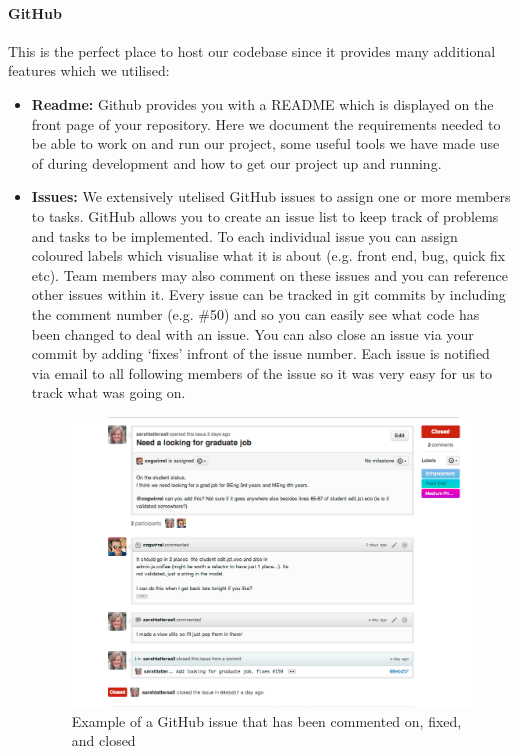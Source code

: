     \paragraph{GitHub\cite{github}} This is the perfect place to host our codebase since it provides many additional features which we utilised:
    \begin{itemize}
        \item \textbf{Readme:} Github provides you with a README which is displayed on the front page of your repository. Here we document the requirements needed to be able to work on and run our project, some useful tools we have made use of during development and how to get our project up and running.
        \item \textbf{Issues:} We extensively utelised GitHub issues to assign one or more members to tasks. GitHub allows you to create an issue list to keep track of problems and tasks to be implemented. To each individual issue you can assign coloured labels which visualise what it is about (e.g. front end, bug, quick fix etc). Team members may also comment on these issues and you can reference other issues within it. Every issue can be tracked in git commits by including the comment number (e.g. \#50) and so you can easily see what code has been changed to deal with an issue. You can also close an issue via your commit by adding `fixes' infront of the issue number. Each issue is notified via email to all following members of the issue so it was very easy for us to track what was going on. 

        \begin{figure}[H]\centering
        \includegraphics[scale=0.3]{images/project_management/team_management/graduate_issue}
        \caption{Example of a GitHub issue that has been commented on, fixed, and closed}


\end{figure}
\end{itemize}
